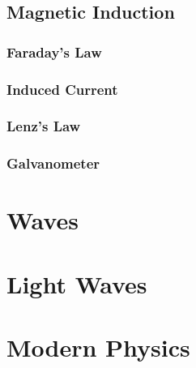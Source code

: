 \documentclass[
  12pt, %
  letterpaper,
]{LegrandOrangeBook}
\begin{document}
\chapter{Magnetic Induction}

\section{Faraday's Law}
\section{Induced Current}
\section{Lenz's Law}
\section{Galvanometer}

\part{Waves}



  

\part{Light Waves}







\part{Modern Physics}
\end{document}
